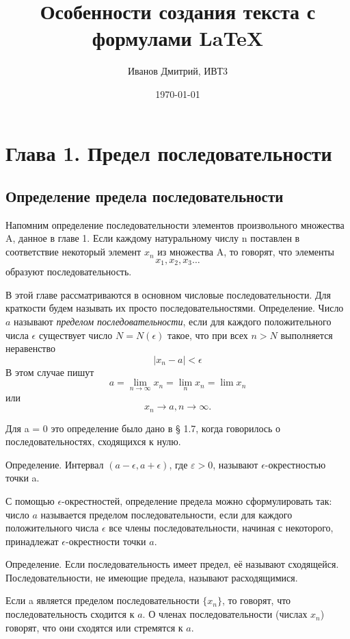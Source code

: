 \documentclass[a4paper,12pt]{article} %
\author{Иванов Дмитрий, ИВТ3}
\title{Особенности создания текста с формулами \LaTeX{}}
\date{\today}
\begin{document}
\maketitle
\newpage

\section{Глава 1. Предел последовательности}
\subsection{Определение предела последовательности}
Напомним определение последовательности элементов произвольного множества A, данное в главе 1. Если каждому натуральному числу n поставлен в соответствие некоторый элемент $x_n$ из множества A, то говорят, что элементы $$x_1, x_2, x_3 \ldots$$ образуют последовательность. 

В этой главе рассматриваются в основном числовые последовательности. Для краткости будем называть их просто последовательностями.
Определение. Число $a$ называют \textit{пределом последовательности}, если для каждого положительного числа $\epsilon$ существует число $N = N(\epsilon)$ такое, что при всех $n > N$ выполняется неравенство $$|x_n - a| < \epsilon$$  В этом случае пишут $$a = \lim_{n\to \infty} x_n = \lim_{n} x_n = \lim x_n$$ или $$x_n\to a,n\to \infty.$$

Для a = 0 это определение было дано в § 1.7, когда говорилось
о последовательностях, сходящихся к нулю.

Определение. Интервал $(a - \epsilon, a + \epsilon)$, где $ε > 0$, называют
$\epsilon$-окрестностью точки a.

С помощью $\epsilon$-окрестностей, определение предела можно сформулировать так: число $a$ называется пределом последовательности, если для каждого положительного числа $\epsilon$ все члены последовательности, начиная с некоторого, принадлежат $\epsilon$-окрестности точки $a$.

Определение. Если последовательность имеет предел, её называют сходящейся. Последовательности, не имеющие предела, называют расходящимися.

Если a является пределом последовательности $\{x_n\}$, то говорят, что последовательность сходится к $a$. О членах последовательности (числах $x_n$) говорят, что они сходятся или стремятся к $a$.
\end{document}

